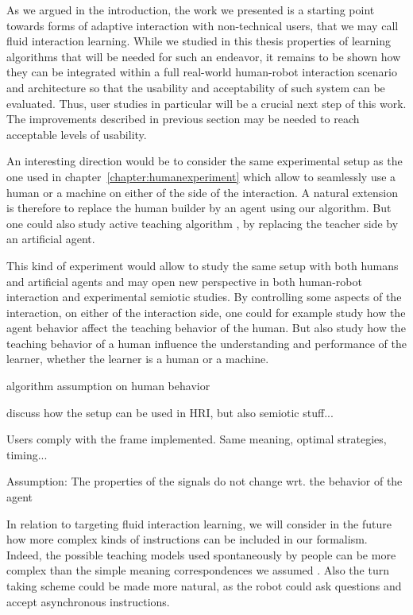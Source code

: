 As we argued in the introduction, the work we presented is a starting point towards forms of adaptive interaction with non-technical users, that we may call fluid interaction learning. While we studied in this thesis properties of learning algorithms that will be needed for such an endeavor, it remains to be shown how they can be integrated within a full real-world human-robot interaction scenario and architecture so that the usability and acceptability of such system can be evaluated. Thus, user studies in particular will be a crucial next step of this work. The improvements described in previous section may be needed to reach acceptable levels of usability.

An interesting direction would be to consider the same experimental setup as the one used in chapter~\ref{chapter:humanexperiment} which allow to seamlessly use a human or a machine on either of the side of the interaction. A natural extension is therefore to replace the human builder by an agent using our algorithm. But one could also study active teaching algorithm \cite{cakmak2012algorithmic}, by replacing the teacher side by an artificial agent.

This kind of experiment would allow to study the same setup with both humans and artificial agents and may open new perspective in both human-robot interaction and experimental semiotic studies. By controlling some aspects of the interaction, on either of the interaction side, one could for example study how the agent behavior affect the teaching behavior of the human. But also study how the teaching behavior of a human influence the understanding and performance of the learner, whether the learner is a human or a machine. 

algorithm assumption on human behavior

discuss how the setup can be used in HRI, but also semiotic stuff...

Users comply with the frame implemented. Same meaning, optimal strategies, timing...

Assumption: The properties of the signals do not change wrt. the behavior of the agent

In relation to targeting fluid interaction learning, we will consider in the future how more complex kinds of instructions can be included in our formalism. Indeed, the possible teaching models used spontaneously by people can be more complex than the simple meaning correspondences we assumed \cite{thomaz2008teachable,Cakmak2010optimality}. Also the turn taking scheme could be made more natural, as the robot could ask questions \cite{cakmak2012designing} and accept asynchronous instructions.

